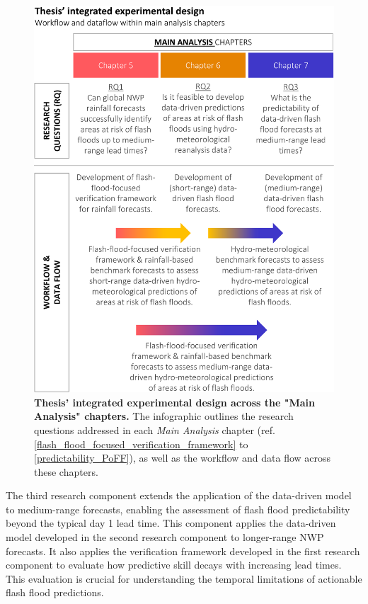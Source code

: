 \begin{figure}[htbp]
\centering
\includegraphics[width=\textwidth]{workflow_dataflow.png}
\caption{\textbf{Thesis' integrated experimental design across the "Main Analysis" chapters.} The infographic outlines the research questions addressed in each \textit{Main Analysis} chapter (ref. \ref{flash_flood_focused_verification_framework} to \ref{predictability_PoFF}), as well as the workflow and data flow across these chapters.}
\label{fig:workflow_dataflow}
\end{figure}

The  third research component extends the application of the data-driven model to medium-range forecasts, enabling the assessment of flash flood predictability beyond the typical day 1 lead time. This component applies the data-driven model developed in the second research component to longer-range NWP forecasts. It also applies the verification framework developed in the first research component to evaluate how predictive skill decays with increasing lead times. This evaluation is crucial for understanding the temporal limitations of actionable flash flood predictions.

